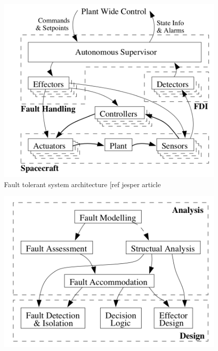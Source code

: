 \begin{table}[H]
	\begin{minipage}[b]{0.49\linewidth}
		\centering
		\begin{figure}[H]
			\centering
			\includegraphics[width=1\linewidth]{figures/FTC}
			\caption{Fault tolerant system architecture [ref jesper article}
			\label{fig:1}
		\end{figure}
	\end{minipage}\hfill
	\begin{minipage}[b]{0.49\linewidth}
		\centering
		\begin{figure}[H]
			\centering
			\includegraphics[width=1\linewidth]{figures/FTC_2}
			\caption{ }
			\label{fig:2}
		\end{figure}
	\end{minipage}
\end{table}

